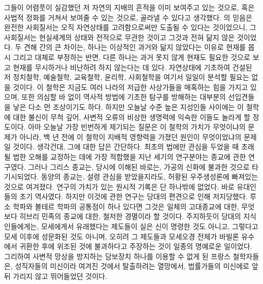 그들이 어렴풋이 실감했던 저 자연의 지배의 흔적을 이미 보여주고 있는 것으로,
혹은 사법적 정화를 거쳐서 보여줄 수 있는 것으로,
골라낼 수 있다고 생각했다.
의 믿음은 완전한 사회질서는 오직 자연상태를 고려함으로써만
도출될 수 있다는 것이었으니, 그 사회질서는
현실세계의 상태와 전적으로 무관한 것이고 그것과 전혀 닮지 않은 것이었다.
두 견해 간의 큰 차이는, 하나는
이상적인 과거와 닮지 않았다는 이유로 현재를 몹시 그리고 대체로 부정하는 반면,
다른 하나는 과거 못지 않게 현재도 필요한 것으로 보고 현재를 무시하거나
비난하려 하지 않는다는 데 있다.
자연상태에 기초하여 건설된 저 정치철학, 예술철학, 교육철학,
윤리학, 사회철학을 여기서 일일이 분석할 필요는 없을 것이다.
이 철학은 지금도 여러 나라의 저급한 사상가들을 매혹하는 힘을 가지고 있으며,
또한 의심할 바 없이 역사적 방법에 기초한 탐구를 방해하는
대부분의 선입견들을 낳은 다소 먼 조상이기도 하다.
하지만 오늘날 수준 높은 지성인들 사이에는 이 철학에 대한 불신이 무척 깊어,
사변적 오류의 비상한 생명력에 익숙한 이들도 놀라게 할 정도이다.
아마 오늘날 가장 빈번하게 제기되는 질문은 이 철학의 가치가 무엇이냐의 문제가
아니라, 백 년 전에 이 철학이 지배적 영향력을 가졌던 원인이
무엇이었냐의 문제일 것이다.
생각건대, 그에 대한 답은 간단하다.
최초의 법에만 관심을 두었을 때 초래될 법한 오해를 교정하는 데에
가장 적합했을 지난 세기의 연구분야는 종교에 관한 연구였다.
그러나 그리스 종교는, 당시에 이해된 바로는, 가공의 신화에 불과한 것으로
타기시되었다.
동양의 종교는, 설령 관심을 받았을지라도, 허황된 우주생성론에
빠져있는 것으로 여겨졌다.
연구의 가치가 있는 원시적 기록은 단 하나밖에 없었다.
바로 유대인들의 초기 역사였다.
하지만 이것에 관한 연구는 당대의 편견으로 인해 저지당했다.
루소 학파와 볼테르 학파의 공통점이 하나 있다면 그것은
일체의 고대종교에 대한, 무엇보다 히브리 민족의 종교에 대한,
철저한 경멸이라 할 것이다.
주지하듯이 당대의 지식인들에게는, 모세에게서 유래했다는 제도들이
실은 신이 명령한 것도 아니고, 그렇다고 모세 이후에 성문화된 것도 아니며,
오히려 그 제도들과 모세오경 전체가
바빌론 유수에서 귀환한 후에 위조된 것에 불과하다고
주장하는 것이 일종의 명예로운 일이었다.
그리하여 사변적 망상을 방지하는 담보장치 하나를 이용할 수 없게 된
프랑스 철학자들은, 성직자들의 미신이라 여겨진 것에서 탈출하려는 열망에서,
법률가들의 미신에로 앞뒤 가리지 않고 뛰어들었던 것이다.


